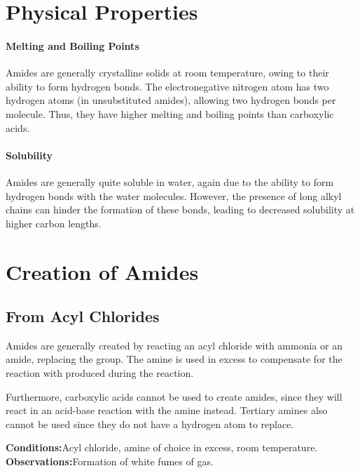 


	\section{Physical Properties}

		\paragraph{Melting and Boiling Points}

		Amides are generally crystalline solids at room temperature, owing to their ability to form hydrogen bonds. The electronegative
		nitrogen atom has two hydrogen atoms (in unsubstituted amides), allowing two hydrogen bonds per molecule. Thus, they have
		higher melting and boiling points than carboxylic acids.


		\paragraph{Solubility}

		Amides are generally quite soluble in water, again due to the ability to form hydrogen bonds with the water molecules. However,
		the presence of long alkyl chains can hinder the formation of these bonds, leading to decreased solubility at higher carbon lengths.




	\pagebreak
	\section{Creation of Amides}

		\subsection{From Acyl Chlorides}

			Amides are generally created by reacting an acyl chloride with ammonia or an amide, replacing the \ch{\chlorine} group. The amine is
			used in excess to compensate for the reaction with  produced during the reaction.

			Furthermore, carboxylic acids cannot be used to create amides, since they will react in an acid-base reaction with the amine instead.
			Tertiary amines also cannot be used since they do not have a hydrogen atom to replace.

			\vspace{1.5em}
			\vbox{\textbf{Conditions:}\tabto{35mm}Acyl chloride, amine of choice in excess, room temperature.}
			\vbox{\textbf{Observations:}\tabto{35mm}Formation of white fumes of  gas.}


